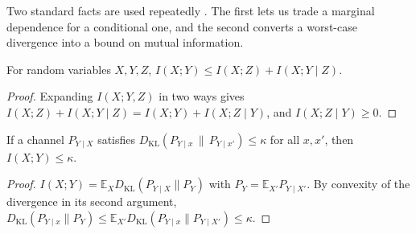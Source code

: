 \documentclass[acmsmall,screen,review,anonymous]{acmart}
\theoremstyle{acmdefinition}%
\newcommand{\KL}{D_{\mathrm{KL}}}
\begin{document}
Two standard facts are used repeatedly \cite{cover2006elements}. The first lets us
trade a marginal dependence for a conditional one, and the second converts a
worst-case divergence into a bound on mutual information.

\begin{lemma}
\label{lem:chain}
For random variables $X, Y, Z$, $I(X;Y) \le I(X;Z) + I(X;Y \mid Z)$.
\end{lemma}
\begin{proof}
Expanding $I(X;Y,Z)$ in two ways gives $I(X;Z) + I(X;Y \mid Z) = I(X;Y) + I(X;Z
\mid Y)$, and $I(X;Z \mid Y) \ge 0$.
\end{proof}

\begin{lemma}
\label{lem:maxkl}
If a channel $P_{Y \mid X}$ satisfies $\KL(P_{Y \mid x} \,\|\, P_{Y \mid x'}) \le
\kappa$ for all $x, x'$, then $I(X;Y) \le \kappa$.
\end{lemma}
\begin{proof}
$I(X;Y) = \mathbb{E}_X \KL(P_{Y \mid X} \| P_Y)$ with $P_Y = \mathbb{E}_{X'} P_{Y
\mid X'}$. By convexity of the divergence in its second argument, $\KL(P_{Y \mid
x} \| P_Y) \le \mathbb{E}_{X'} \KL(P_{Y \mid x} \| P_{Y \mid X'}) \le \kappa$.
\end{proof}
\end{document}
